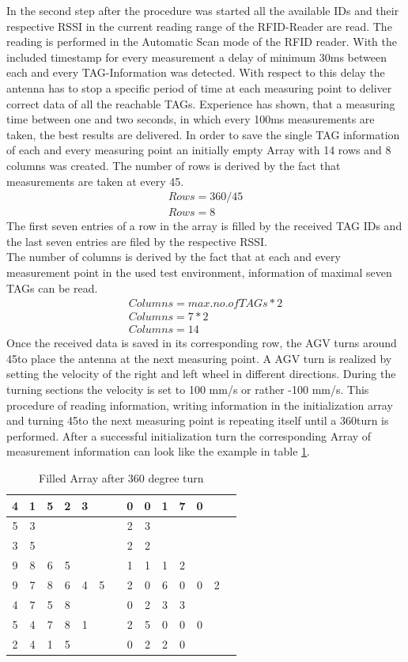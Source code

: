 In the second step after the procedure was started all the available IDs and their respective RSSI in the current reading range of the RFID-Reader are read. The reading is performed in the Automatic Scan mode of the RFID reader. With the included timestamp for every measurement a delay of minimum 30ms between each and every TAG-Information was detected. With respect to this delay the antenna has to stop a specific period of time at each measuring point to deliver correct data of all the reachable TAGs. Experience has shown, that a measuring time between one and two seconds, in which every 100ms measurements are taken, the best results are delivered. In order to save the single TAG information of each and every measuring point an initially empty Array with 14 rows and 8 columns was created. 
The number of rows is derived by the fact that measurements are taken at every 45\textdegree. \\
\begin{align}
Rows = 360/45\\
Rows = 8
\end{align}
The first seven entries of a row in the array is filled by the received TAG IDs and the last seven entries are filed by the respective RSSI. \\
The number of columns is derived by the fact that at each and every measurement point in the used test environment, information of maximal seven TAGs can be read. \\
\begin{align}
Columns = max. no. of  TAGs * 2\\
Columns = 7 * 2\\
Columns = 14
\end{align}
Once the received data is saved in its corresponding row, the AGV turns around 45\textdegree  to place the antenna at the next measuring point. A AGV turn is realized by setting the velocity of the right and left wheel in different directions. During the turning sections the velocity is set to 100 mm/s or rather -100 mm/s. 
This procedure of reading information, writing information in the initialization array and turning 45\textdegree  to the next measuring point is repeating itself until a 360\textdegree  turn is performed. After a successful initialization turn the corresponding Array of measurement information can look like the example in table \ref{Init_Array}.
\begin{table}[!htbp]
\centering
\begin{tabular}{|c|c|c|c|c|c|c|c|c|c|c|c|c|c|}
\hline
4&1&5&2&3&&&0&0&1&7&0&&  \\ \hline
5&3&&&&&&2&3&&&&&  \\ \hline
3&5&&&&&&2&2&&&&&  \\ \hline
9&8&6&5&&&&1&1&1&2&&&  \\ \hline
9&7&8&6&4&5&&2&0&6&0&0&2&  \\ \hline
4&7&5&8&&&&0&2&3&3&&&  \\ \hline
5&4&7&8&1&&&2&5&0&0&0&&  \\ \hline
2&4&1&5&&&&0&2&2&0&&&  \\ \hline
\end{tabular}
\caption{Filled Array after 360 degree turn}
\label{Init_Array}
\end{table}\\
